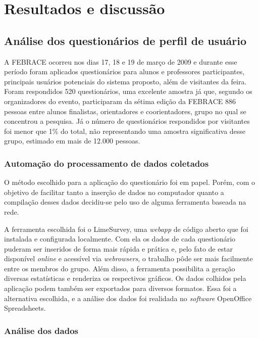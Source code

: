 
\chapter{Resultados e discussão}

\section{Análise dos questionários de perfil de usuário}

    A FEBRACE ocorreu nos dias 17, 18 e 19 de março de 2009 e durante esse período foram aplicados questionários para alunos e professores participantes, principais usuários potenciais do sistema proposto, além de visitantes da feira. Foram respondidos 520 questionários, uma excelente amostra já que, segundo os organizadores do evento, participaram da sétima edição da FEBRACE 886 pessoas entre alunos finalistas, orientadores e coorientadores, grupo no qual se concentrou a pesquisa. Já o número de questionários respondidos por visitantes foi menor que 1\% do total, não representando uma amostra significativa desse grupo, estimado em mais de 12.000 pessoas.

  \subsection{Automação do processamento de dados coletados}
    O método escolhido para a aplicação do questionário foi em papel. Porém, com o objetivo de facilitar tanto a inserção de dados no computador quanto a compilação desses dados decidiu-se pelo uso de alguma ferramenta baseada na rede.

    A ferramenta escolhida foi o LimeSurvey, uma \textit{webapp} de código aberto que foi instalada e configurada localmente. Com ela os dados de cada questionário puderam ser inseridos de forma mais rápida e prática e, pelo fato de estar disponível \textit{online} e acessível via \textit{webrowsers}, o trabalho pôde ser mais facilmente entre os membros do grupo. Além disso, a ferramenta possibilita a geração diversas estatísticas e renderiza os respectivos gráficos. Os dados colhidos pela aplicação podem também ser exportados para diversos formatos. Essa foi a alternativa escolhida, e a análise dos dados foi realidada no \textit{software} OpenOffice Spreadsheets.

  \subsection{Análise dos dados}

